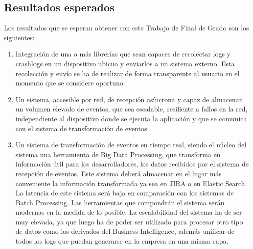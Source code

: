 \subsection{Resultados esperados}
Los resultados que se esperan obtener con este Trabajo de Final de Grado son los siguientes:

\begin{enumerate}
		
	\item Integración de una o más librerías que sean capaces de recolectar logs y crashlogs en un dispositivo ubicuo y enviarlos a un sistema externo. Esta recolección y envío se ha de realizar de forma transparente al usuario en el momento que se considere oportuno. 
	
	\item Un sistema, accesible por red, de recepción asíncrona y capaz de almacenar un volumen elevado de eventos, que sea escalable, resiliente a fallos en la red, independiente al dispositivo donde se ejecuta la aplicación y que se comunica con el sistema de transformación de eventos.
	
	\item Un sistema de transformación de eventos en tiempo real, siendo el núcleo del sistema una herramienta de Big Data Processing, que transforma en información útil para los desarrolladores, los datos recibidos por el sistema de recepción de eventos. Este sistema deberá almacenar en el lugar más conveniente la información transformada ya sea en JIRA o en Elastic Search. La latencia de este sistema será baja en comparación con los sistemas de Batch Processing. Las herramientas que compondrán el sistema serán modernas en la medida de lo posible. La escalabilidad del sistema ha de ser muy elevada, ya que luego ha de poder ser utilizado para procesar otro tipo de datos como los derivados del Business Intelligence, además unificar de todos los logs que puedan generarse en la empresa en una misma capa.
	
\end{enumerate}





